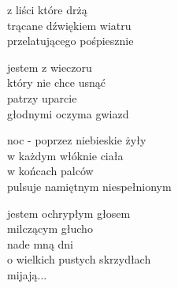 
\begin{text}
    z liści które drżą\\
    trącane dźwiękiem wiatru\\
    przelatującego pośpiesznie

    jestem z wieczoru\\
    który nie chce usnąć\\
    patrzy uparcie\\
    głodnymi oczyma gwiazd

    noc - poprzez niebieskie żyły\\
    w każdym włóknie ciała\\
    w końcach palców\\
    pulsuje namiętnym niespełnionym

    jestem ochrypłym głosem\\
    milczącym głucho\\
    nade mną dni\\
    o wielkich pustych skrzydłach\\
    mijają...
\end{text}
\begin{chord}

\end{chord}